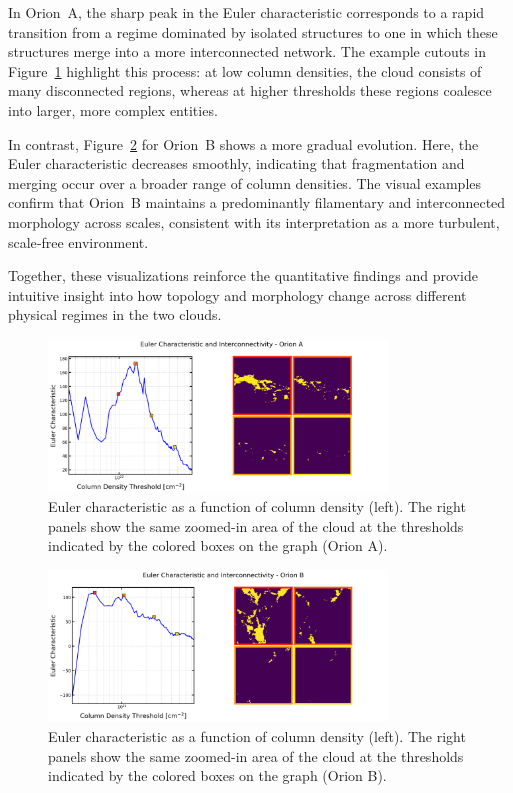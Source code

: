In Orion~A, the sharp peak in the Euler characteristic corresponds to a rapid transition from a regime dominated by isolated structures to one in which these structures merge into a more interconnected network.  
The example cutouts in Figure~\ref{fig:Euler_Orion_A} highlight this process: at low column densities, the cloud consists of many disconnected regions, whereas at higher thresholds these regions coalesce into larger, more complex entities.

In contrast, Figure~\ref{fig:Euler_Orion_B} for Orion~B shows a more gradual evolution.  
Here, the Euler characteristic decreases smoothly, indicating that fragmentation and merging occur over a broader range of column densities.  
The visual examples confirm that Orion~B maintains a predominantly filamentary and interconnected morphology across scales, consistent with its interpretation as a more turbulent, scale‑free environment.

Together, these visualizations reinforce the quantitative findings and provide intuitive insight into how topology and morphology change across different physical regimes in the two clouds.

\begin{figure}[t]
    \centering
    \includegraphics[width=0.8\textwidth]{figures/euler_Orion_A.png}
    \caption{Euler characteristic as a function of column density (left). The right panels show the same zoomed-in area of the cloud at the thresholds indicated by the colored boxes on the graph (Orion A).}
    \label{fig:Euler_Orion_A}
\end{figure}

\begin{figure}[t]
    \centering
    \includegraphics[width=0.8\textwidth]{figures/euler_Orion_B.png}
    \caption{Euler characteristic as a function of column density (left). The right panels show the same zoomed-in area of the cloud at the thresholds indicated by the colored boxes on the graph (Orion B).}
    \label{fig:Euler_Orion_B}
\end{figure}

